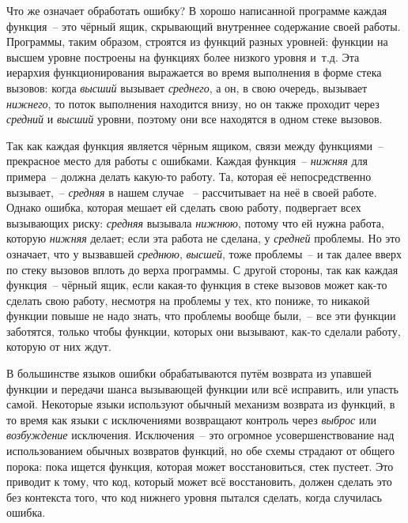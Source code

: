 Что же означает обработать ошибку? В хорошо написанной программе каждая функция~-- это
чёрный ящик, скрывающий внутреннее содержание своей работы. Программы, таким образом,
строятся из функций разных уровней: функции на высшем уровне построены на функциях более
низкого уровня и~т.д.  Эта иерархия функционирования выражается во время выполнения в
форме стека вызовов: когда \emph{высший} вызывает \emph{среднего}, а он, в свою очередь,
вызывает \emph{нижнего}, то поток выполнения находится внизу, но он также проходит через
\emph{средний} и \emph{высший} уровни, поэтому они все находятся в одном стеке вызовов.

Так как каждая функция является чёрным ящиком, связи между функциями~-- прекрасное место
для работы с ошибками. Каждая функция~-- \emph{нижняя} для примера~-- должна делать
какую-то работу. Та, которая её непосредственно вызывает,~-- \emph{средняя} в нашем случае
~-- рассчитывает на неё в своей работе. Однако ошибка, которая мешает ей сделать свою
работу, подвергает всех вызывающих риску: \emph{средняя} вызывала \emph{нижнюю}, потому
что ей нужна работа, которую \emph{нижняя} делает; если эта работа не сделана, у
\emph{средней} проблемы. Но это означает, что у вызвавшей \emph{среднюю}, \emph{высшей},
тоже проблемы~-- и так далее вверх по стеку вызовов вплоть до верха программы. С другой
стороны, так как каждая функция~-- чёрный ящик, если какая-то функция в стеке вызовов может
как-то сделать свою работу, несмотря на проблемы у тех, кто пониже, то никакой функции
повыше не надо знать, что проблемы вообще были,~-- все эти функции заботятся, только чтобы
функции, которых они вызывают, как-то сделали работу, которую от них ждут.

В большинстве языков ошибки обрабатываются путём возврата из упавшей функции и передачи
шанса вызывающей функции или всё исправить, или упасть самой. Некоторые языки используют
обычный механизм возврата из функций, в то время как языки с исключениями возвращают
контроль через \textit{выброс} или \textit{возбуждение} исключения. Исключения~-- это
огромное усовершенствование над использованием обычных возвратов функций, но обе схемы
страдают от общего порока: пока ищется функция, которая может восстановиться, стек
пустеет. Это приводит к тому, что код, который может всё восстановить, должен сделать это
без контекста того, что код нижнего уровня пытался сделать, когда случилась ошибка.

